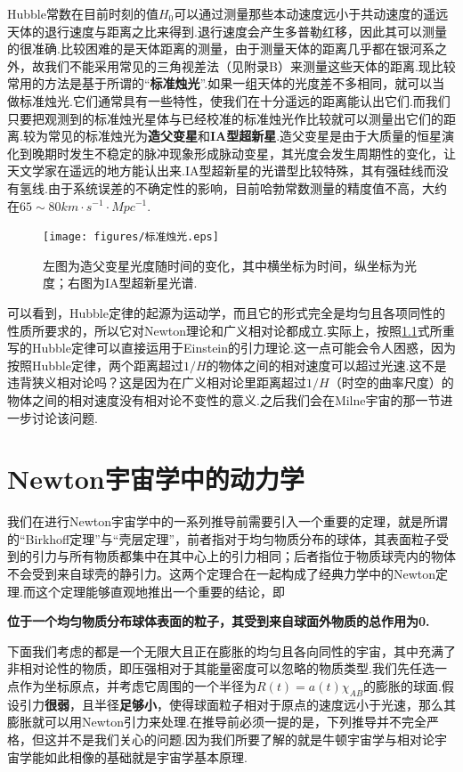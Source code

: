 \documentclass[a4paper]{book}
\begin{document}
Hubble常数在目前时刻的值$H_0$可以通过测量那些本动速度远小于共动速度的遥远天体的退行速度与距离之比来得到.退行速度会产生多普勒红移，因此其可以测量的很准确.比较困难的是天体距离的测量，由于测量天体的距离几乎都在银河系之外，故我们不能采用常见的三角视差法（见附录B）来测量这些天体的距离.现比较常用的方法是基于所谓的“\textbf{标准烛光}”.如果一组天体的光度差不多相同，就可以当做标准烛光.它们通常具有一些特性，使我们在十分遥远的距离能认出它们.而我们只要把观测到的标准烛光星体与已经校准的标准烛光作比较就可以测量出它们的距离.较为常见的标准烛光为\textbf{造父变星}和\textbf{IA型超新星}.造父变星是由于大质量的恒星演化到晚期时发生不稳定的脉冲现象形成脉动变星，其光度会发生周期性的变化，让天文学家在遥远的地方能认出来.IA型超新星的光谱型比较特殊，其有强硅线而没有氢线.由于系统误差的不确定性的影响，目前哈勃常数测量的精度值不高，大约在$65\sim80km\cdot s^{-1}\cdot Mpc^{-1}$.
\begin{figure}[!h]
	\centering
	\texttt{[image: figures/标准烛光.eps]}
	\caption{左图为造父变星光度随时间的变化，其中横坐标为时间，纵坐标为光度；右图为IA型超新星光谱.}
\end{figure}\par 
可以看到，Hubble定律的起源为运动学，而且它的形式完全是均匀且各项同性的性质所要求的，所以它对Newton理论和广义相对论都成立.实际上，按照\hyperref[1.1]{1.1}式所重写的Hubble定律可以直接运用于Einstein的引力理论.这一点可能会令人困惑，因为按照Hubble定律，两个距离超过$1/H$的物体之间的相对速度可以超过光速.这不是违背狭义相对论吗？这是因为在广义相对论里距离超过$1/H$（时空的曲率尺度）的物体之间的相对速度没有相对论不变性的意义.之后我们会在Milne宇宙的那一节进一步讨论该问题.
\section{Newton宇宙学中的动力学}
我们在进行Newton宇宙学中的一系列推导前需要引入一个重要的定理，就是所谓的“Birkhoff定理”与“壳层定理”，前者指对于均匀物质分布的球体，其表面粒子受到的引力与所有物质都集中在其中心上的引力相同；后者指位于物质球壳内的物体不会受到来自球壳的静引力。这两个定理合在一起构成了经典力学中的Newton定理.而这个定理能够直观地推出一个重要的结论，即
\centerline{\textbf{位于一个均匀物质分布球体表面的粒子，其受到来自球面外物质的总作用为0.}}\par 
下面我们考虑的都是一个无限大且正在膨胀的均匀且各向同性的宇宙，其中充满了非相对论性的物质，即压强相对于其能量密度可以忽略的物质类型.我们先任选一点作为坐标原点，并考虑它周围的一个半径为$R(t)=a(t)\chi_{AB}$的膨胀的球面.假设引力\textbf{很弱}，且半径\textbf{足够小}，使得球面粒子相对于原点的速度远小于光速，那么其膨胀就可以用Newton引力来处理.在推导前必须一提的是，下列推导并不完全严格，但这并不是我们关心的问题.因为我们所要了解的就是牛顿宇宙学与相对论宇宙学能如此相像的基础就是宇宙学基本原理.\par 
\end{document}
